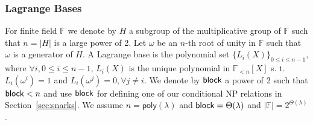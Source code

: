 \subsubsection{Lagrange Bases}
\label{sec:lagrange}
For finite field $\mathbb{F}$ we denote by $H$ a subgroup of the multiplicative group of $\mathbb{F}$ such that $n = |H|$ is a large power of 2. 
Let $\omega$ be an $n$-th root of unity in $\mathbb{F}$ such that $\omega$ is a generator of $H$. A Lagrange base is the polynomial set $\{L_i(X)\} _{0 \leq i\leq n-1}$, 
where $\forall i, 0 \leq i \leq n-1$, $L_i(X)$ is the unique polynomial in $\mathbb{F}_{<n}[X]$ s. t. $L_i(\omega^i) =1$ and $L_i(\omega^j) = 0, \forall j \neq i$. 
We denote by $\mathsf{block}$ a power of 2 such that $\mathsf{block} < n$ and use $\mathsf{block}$ for defining one of our conditional NP relations in 
Section~\ref{sec:snarks}. 
We assume $n = \mathsf{poly} (\lambda)$ and $\mathsf{block} = \Theta(\lambda)$ and $|\mathbb{F}|= 2^{\Theta(\lambda)}$.
\vspace{-0.07in}
 


